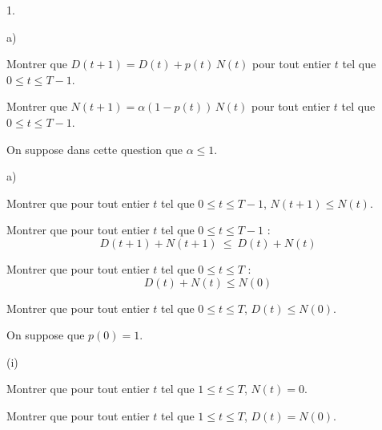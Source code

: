 \documentclass[11pt]{article}%
\begin{document}
\begin{noliste}{1.}
  \setlength{\itemsep}{4mm}
  \item 
  \begin{noliste}{a)}
    \setlength{\itemsep}{2mm}
    \item Montrer que $D(t+1)=D(t) + p(t) \, N(t)$ pour tout entier $t$ 
    tel que $0 \leq t \leq T-1$.
    
    
    
    

    
    \item Montrer que $N(t+1)=\alpha (1-p(t)) \, N(t)$ pour tout entier 
    $t$ tel que $0 \leq t \leq T-1$.
    
    
  \end{noliste}
  
  \item On suppose dans cette question que $\alpha \leq 1$.
  \begin{noliste}{a)}
    \setlength{\itemsep}{2mm}
    \item Montrer que pour tout entier $t$ tel que $0 \leq t \leq T-1$,
    $N(t+1) \leq N(t)$.
    
    

    
    \item Montrer que pour tout entier $t$ tel que $0 \leq t \leq T-1$ :
    \[
      D(t+1) + N(t+1) \ \leq \ D(t)+N(t)
    \]
    
    
    
    
   
    
    \item Montrer que pour tout entier $t$ tel que $0 \leq t \leq T$ :
    \[
      D(t) + N(t) \leq N(0)
    \]
    
    

    
    \item Montrer que pour tout entier $t$ tel que $0 \leq t \leq T$, 
    $D(t) \leq N(0)$.
    
    

    
    \item On suppose que $p(0)=1$.
    \begin{nonoliste}{(i)}
      \item Montrer que pour tout entier $t$ tel que $1 \leq t \leq T$, 
      $N(t)=0$.
      
      

      
      \item Montrer que pour tout entier $t$ tel que $1 \leq t \leq T$,
      $D(t)=N(0)$.
      

\end{nonoliste}
\end{noliste}
\end{noliste}
\end{document}
